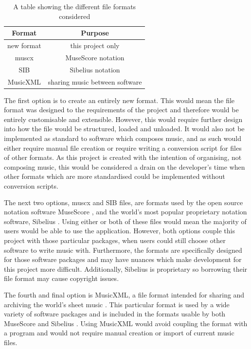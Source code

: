 \begin{table}[H]
\centering
\begin{tabular}{| c | c | } \hline
  {\textbf{Format}} & {\textbf{Purpose}} \\ \hline
  new format & this project only \\ \hline
  muscx & MuseScore notation \\ \hline
  SIB & Sibelius notation \\ \hline
  MusicXML & sharing music between software \\ \hline
\end{tabular}
\caption{A table showing the different file formats considered}
\label{table:formats}
\end{table}
The first option is to create an entirely new format. This would mean the file format was designed to the requirements of the project and therefore would be entirely customisable and extensible. However, this would require further design into how the file would be structured, loaded and unloaded.
 It would also not be implemented as standard to software which composes music, and as such would either require manual file creation or require writing a conversion script for files of other formats. As this project is created with the intention of organising, not composing music, this would be considered a drain on the developer's time when other formats which are more standardised could be implemented without conversion scripts.

The next two options, muscx and SIB files, are formats used by the open source notation software MuseScore \parencite{MuseTour}, and the world's most popular proprietary notation software, Sibelius \parencite{avid}. Using either or both of these files would mean the majority of users would be able to use the application. 
However, both options couple this project with those particular packages, when users could still choose other software to write music with. Furthermore, the formats are specifically designed for those software packages and may have nuances which make development for this project more difficult. Additionally, Sibelius is proprietary so borrowing their file format may cause copyright issues.


The fourth and final option is MusicXML, a file format intended for sharing and archiving the world's sheet music \parencite{mxml}. This particular format is used by a wide variety of software packages \parencite{mxml} and is included in the formats usable by both MuseScore \parencite{MuseTour} and Sibelius \parencite{avid}. Using MusicXML would avoid coupling the format with a program and would not require manual creation or import of current music files. 

